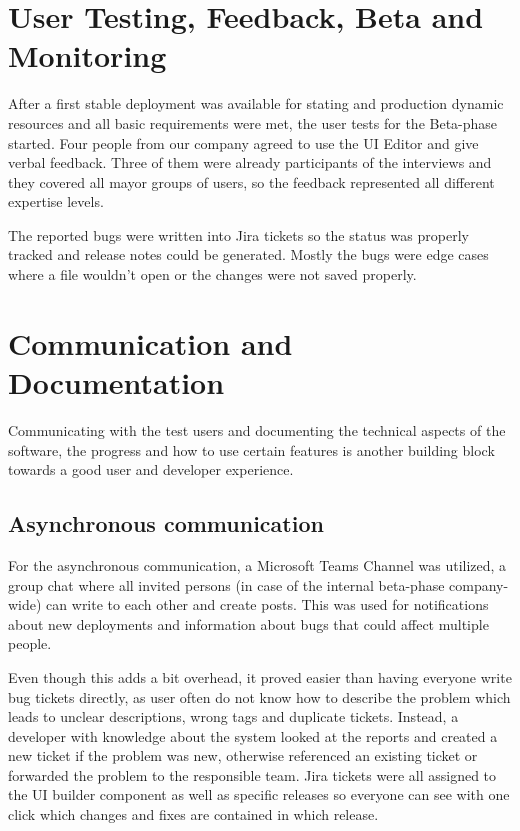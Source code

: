 \section{User Testing, Feedback, Beta and Monitoring}

After a first stable deployment was available for stating and production dynamic resources and all basic requirements were met, the user tests for the Beta-phase started.
Four people from our company agreed to use the UI Editor and give verbal feedback. Three of them were already participants of the interviews and they covered all mayor groups of users,
so the feedback represented all different expertise levels.

The reported bugs were written into Jira tickets so the status was properly tracked and release notes could be generated.
Mostly the bugs were edge cases where a file wouldn't open or the changes were not saved properly.


\section{Communication and Documentation}
Communicating with the test users and documenting the technical aspects of the software, the progress and how to use certain features is
another building block towards a good user and developer experience.
\subsection{Asynchronous communication}

For the asynchronous communication, a Microsoft Teams Channel was utilized, a group chat where all invited persons (in case of the internal beta-phase company-wide) can write to each other and create posts. This was used for notifications about new deployments and information about bugs that could affect multiple people.

Even though this adds a bit overhead, it proved easier than having everyone write bug tickets directly, as user often do not know how to describe the problem which leads to unclear descriptions, wrong tags and duplicate tickets.
Instead, a developer with knowledge about the system looked at the reports and created a new ticket if the problem was new, otherwise referenced an existing ticket or forwarded the problem to the responsible team.
Jira tickets were all assigned to the UI builder component as well as specific releases so everyone can see with one click which changes and fixes are contained in which release.

